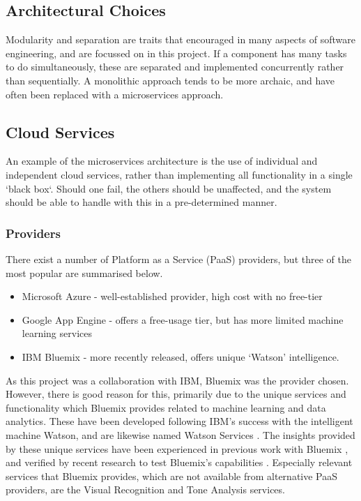 \documentclass{article}
\begin{document}
\subsection{Architectural Choices}
Modularity and separation are traits that encouraged in many aspects of software engineering, and are focussed on in this project. If a component has many tasks to do simultaneously, these are separated and implemented concurrently rather than sequentially. A monolithic approach tends to be more archaic, and have often been replaced with a microservices approach. 

\subsection{Cloud Services}
An example of the microservices architecture is the use of individual and independent cloud services, rather than implementing all functionality in a single `black box`. Should one fail, the others should be unaffected, and the system should be able to handle with this in a pre-determined manner. 
\subsubsection{Providers}
There exist a number of Platform as a Service (PaaS) providers, but three of the most popular are summarised below.
\begin{itemize}
    \item Microsoft Azure - well-established provider, high cost with no free-tier
    \item Google App Engine - offers a free-usage tier, but has more limited machine learning services
    \item IBM Bluemix - more recently released, offers unique `Watson' intelligence.
\end{itemize}
As this project was a collaboration with IBM, Bluemix was the provider chosen. However, there is good reason for this, primarily due to the unique services and functionality which Bluemix provides related to machine learning and data analytics. These have been developed following IBM's success with the intelligent machine Watson, and are likewise named Watson Services \cite{Watson}. The insights provided by these unique services have been experienced in previous work with Bluemix \cite{EdgeOfSpace}, and verified by recent research to test Bluemix's capabilities \cite{Sentiment}. Especially relevant services that Bluemix provides, which are not available from alternative PaaS providers, are the Visual Recognition and Tone Analysis services.
\end{document}
